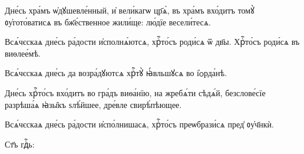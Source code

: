 
\label{fiftybogorod}
%

\hKv Дне́сь хра́мъ ѡ҆дꙋшевле́нный, и҆  вели́кагѡ цр҃ѧ̀, въ хра́мъ вхо́дитъ томꙋ̀ ᲂу҆гото́ватисѧ въ  бж҃е́ственное жили́ще: лю́дїе весели́тесѧ. 
%

 Всѧ́чєскаѧ дне́сь ра́дости и҆сполнѧ́ютсѧ, хрⷭ҇то́съ  роди́сѧ ѿ дв҃ы. 
%
\hKv Хрⷭ҇то́съ роди́сѧ въ виѳлее́мѣ.  

 Всѧ́чєскаѧ дне́сь да возра́дꙋютсѧ хрⷭ҇тꙋ̀  ꙗ҆́вльшꙋсѧ во і҆ѻрда́нѣ.  

%
%

\hKv Дне́сь хрⷭ҇то́съ вхо́дитъ во гра́дъ  виѳа́нїю, на жребѧ́ти сѣдѧ́й, безслове́сїе разрѣша́ѧ  ꙗ҆зы̑къ ѕлѣ́йшее, дре́вле свирѣ́пѣющее. 

%
%
 Всѧ́чєскаѧ дне́сь ра́дости и҆спо́лнишасѧ, хрⷭ҇то́съ  преѡбрази́сѧ пред̾ ᲂу҆ч҃нкѝ. 
%

%
Ст҃ъ гдⷭ҇ь: 
